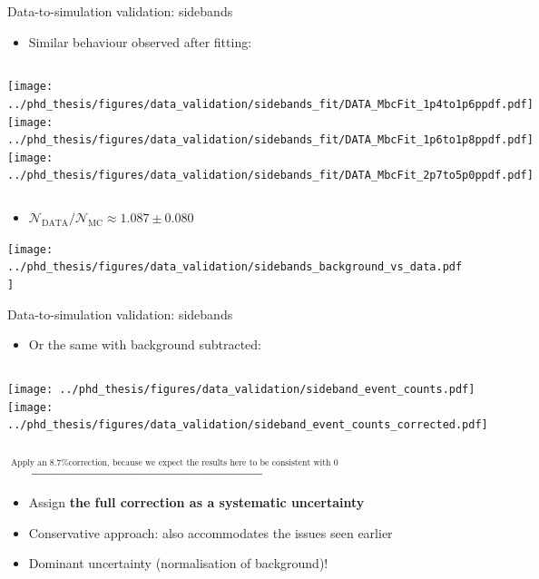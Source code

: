 \documentclass[xcolor=dvipsnames]{beamer}
\begin{document}
\begin{frame}{Data-to-simulation validation: sidebands}
   \scriptsize\centering
   \begin{itemize}
      \item Similar behaviour observed after fitting:
   \end{itemize}

   \begin{columns}
      \centering
      \texttt{[image: ../phd\_thesis/figures/data\_validation/sidebands\_fit/DATA\_MbcFit\_1p4to1p6ppdf.pdf]}
      \centering
      \texttt{[image: ../phd\_thesis/figures/data\_validation/sidebands\_fit/DATA\_MbcFit\_1p6to1p8ppdf.pdf]}
      \centering
      \texttt{[image: ../phd\_thesis/figures/data\_validation/sidebands\_fit/DATA\_MbcFit\_2p7to5p0ppdf.pdf]}
   \end{columns}

   \begin{itemize}
      \item $\mathcal{N}_{\mathrm{DATA}}/\mathcal{N}_{\mathrm{MC}}\approx 1.087\pm 0.080$
   \end{itemize}

   \texttt{[image: ../phd\_thesis/figures/data\_validation/sidebands\_background\_vs\_data.pdf]}

\end{frame}
\begin{frame}{Data-to-simulation validation: sidebands}
   \scriptsize\centering
   \begin{itemize}
      \item Or the same with background subtracted:
   \end{itemize}

   \begin{columns}
      \centering
      \texttt{[image: ../phd\_thesis/figures/data\_validation/sideband\_event\_counts.pdf]}
    \centering
     \texttt{[image: ../phd\_thesis/figures/data\_validation/sideband\_event\_counts\_corrected.pdf]}
   \end{columns}

   $\xrightarrow{\text{Apply an 8.7\% correction, because we expect the results here to be consistent with 0}}$

   \begin{itemize}
      \item Assign \textbf{the full correction as a systematic uncertainty}
      \item[\ra] Conservative approach: also accommodates the issues seen earlier
      \item[\ra] Dominant uncertainty (normalisation of background)!
   \end{itemize}

\end{frame}
\end{document}
